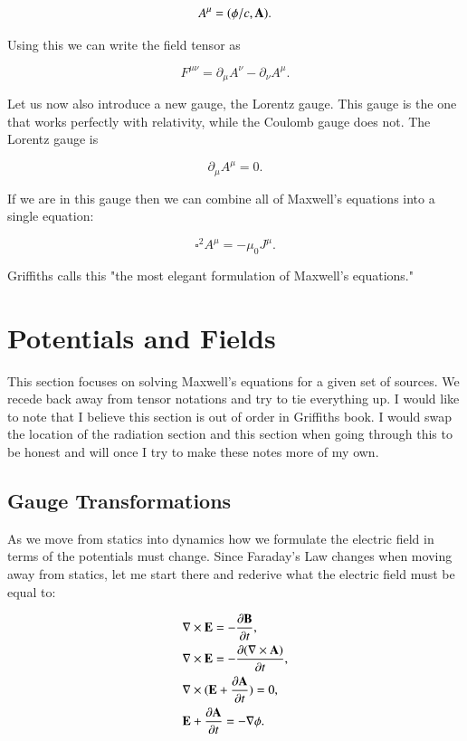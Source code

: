 \documentclass[preprint, review,12pt]{elsarticle}
\def\x{\times}
\def\b{\textbf}
\def\curl{\nabla \x}
\newcommand{\pd}[2]{\frac{\partial #1 }{\partial #2}}
\begin{document}
\begin{equation}
    A^\mu = (\phi/c, \b A).
\end{equation}

Using this we can write the field tensor as 

\begin{equation}
    F^{\mu\nu} = \partial_\mu A^\nu - \partial_\nu A^\mu.
\end{equation}

Let us now also introduce a new gauge, the Lorentz gauge. This gauge is the one that works perfectly with relativity, while the Coulomb gauge does not. The Lorentz gauge is 

\begin{equation}
    \partial_\mu A^\mu = 0.
\end{equation}

If we are in this gauge then we can combine all of Maxwell's equations into a single equation:

\begin{equation}
    \square^2 A^\mu = - \mu_0 J^\mu.
\end{equation}

Griffiths calls this "the most elegant formulation of Maxwell's equations."

\section{Potentials and Fields}

This section focuses on solving Maxwell's equations for a given set of sources. We recede back away from tensor notations and try to tie everything up. I would like to note that I believe this section is out of order in Griffiths book. I would swap the location of the radiation section and this section when going through this to be honest and will once I try to make these notes more of my own.

\subsection{Gauge Transformations}

As we move from statics into dynamics how we formulate the electric field in terms of the potentials must change. Since Faraday's Law changes when moving away from statics, let me start there and rederive what the electric field must be equal to:

\begin{equation*}
\begin{split}
    & \curl \b E = -\pd{\b B}{t}, \\
    & \curl \b E = -\pd{(\curl \b A)}{t}, \\
    & \curl (\b E + \pd{\b A}{t} ) = 0, \\
    & \b E + \pd{\b A}{t} = -\nabla \phi.
\end{split}
\end{equation*}
\end{document}
